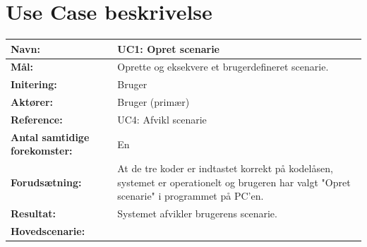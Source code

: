 \section{Use Case beskrivelse}
\begin{table}[h]
\begin{tabularx}{\textwidth}{| l | >{\raggedright\arraybackslash}X |} \hline
\textbf{Navn:} 						& UC1: Opret scenarie\\ \hline
\textbf{Mål:}						& Oprette og eksekvere et brugerdefineret scenarie. \\ \hline
\textbf{Initering:}					& Bruger \\ \hline
\textbf{Aktører:} 					& Bruger (primær) \\ \hline
\textbf{Reference:} 					& UC4: Afvikl scenarie \\ \hline
\textbf{Antal samtidige forekomster:} & En \\ \hline
\textbf{Forudsætning:} 				& At de tre koder er indtastet korrekt på kodelåsen, systemet er operationelt og brugeren har valgt "Opret scenarie" i programmet på PC'en.\\ \hline
\textbf{Resultat:}					& Systemet afvikler brugerens scenarie. \\ \hline
\textbf{Hovedscenarie:}				& 


\end{tabularx}
\end{table}
